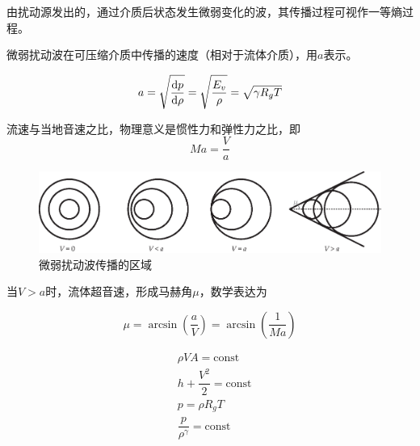 


\begin{definition}[微弱扰动波]\label{def11.1}
	由扰动源发出的，通过介质后状态发生微弱变化的波，其传播过程可视作一等熵过程。
\end{definition}


\begin{definition}[音速]
	微弱扰动波在可压缩介质中传播的速度（相对于流体介质），用$a$表示。
\end{definition}

\begin{equation}
	a = \sqrt{\dv{p}{\rho}} = \sqrt{\dfrac{E_v}{\rho}} = \sqrt{\gamma R_g T}
\end{equation}


\begin{definition}
	流速与当地音速之比，物理意义是惯性力和弹性力之比，即
	\begin{equation}
		Ma = \dfrac{V}{a}
	\end{equation}
\end{definition}


\begin{figure}[H]
	\centering
	\includegraphics[scale=0.7]{figures/微弱扰动波.eps}
	\caption{微弱扰动波传播的区域}
\end{figure}

当$V > a$时，流体超音速，形成马赫角$\mu$，数学表达为

\begin{equation*}
	\mu = \arcsin(\dfrac{a}{V}) = \arcsin(\dfrac{1}{Ma})
\end{equation*}


\begin{align*}
	&\rho V A = \text{const}\\
	&h + \dfrac{V^2}{2} = \text{const}\\
	&p = \rho R_g T\\
	&\dfrac{p}{\rho^{\gamma}} = \text{const}
\end{align*}


